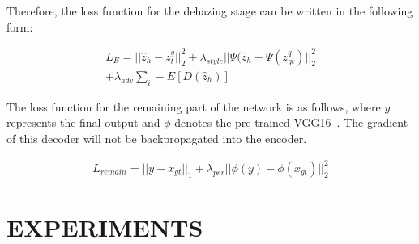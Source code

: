 \documentclass[journal]{IEEEtran}
\begin{document}
Therefore, the loss function for the dehazing stage can be written in the following form:

\begin{equation}
	\label{encoder_loss}
	\begin{split}
		L_{E} =||\widehat{z}_{h} - z^{q}_{t} ||_{2}^{2} + \lambda_{style} ||\Psi(\widehat{z}_{h} - \Psi(z^{q}_{gt}) ||_{2}^{2} \\
		+ \lambda_{adv}\sum_{i} -E[D(\widehat{z}_{h})]
	\end{split}
\end{equation}

The loss function for the remaining part of the network is as follows, where $y$ represents the final output and $\phi$ denotes the pre-trained VGG16~\cite{simonyan2014very}. The gradient of this decoder will not be backpropagated into the encoder.

\begin{equation}
	\label{rest_loss}
	\begin{split}
		L_{remain} =||y - x_{gt} ||_{1} + \lambda_{per} ||\phi(y) - \phi(x_{gt}) ||_{2}^{2}
	\end{split}
\end{equation}



\section{EXPERIMENTS}
\end{document}
